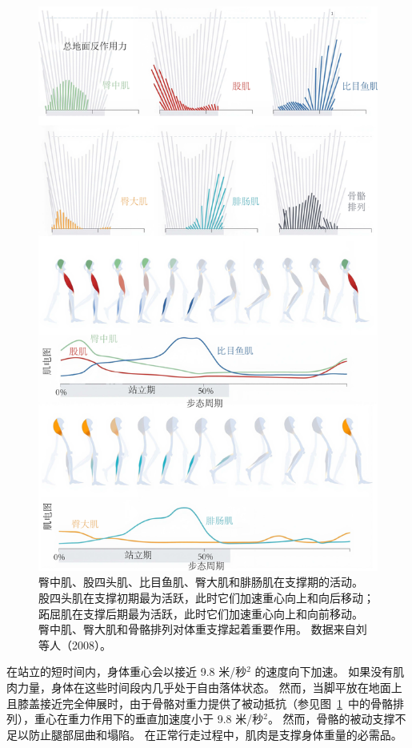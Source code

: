 \begin{figure}[!htb]
	\centering
	\includegraphics[width=1.0\linewidth]{chap11/11_2}
	\caption{臀中肌、股四头肌、比目鱼肌、臀大肌和腓肠肌在支撑期的活动。
		股四头肌在支撑初期最为活跃，此时它们加速重心向上和向后移动；
		跖屈肌在支撑后期最为活跃，此时它们加速重心向上和向前移动。
		臀中肌、臀大肌和骨骼排列对体重支撑起着重要作用。
		数据来自刘等人（2008）。 \label{fig:11_2}}
\end{figure}

在站立的短时间内，身体重心会以接近 9.8 米/秒$^2$ 的速度向下加速。
如果没有肌肉力量，身体在这些时间段内几乎处于自由落体状态。
然而，当脚平放在地面上且膝盖接近完全伸展时，由于骨骼对重力提供了被动抵抗（参见图~\ref{fig:11_2}~中的骨骼排列），重心在重力作用下的垂直加速度小于 9.8 米/秒$^2$。
然而，骨骼的被动支撑不足以防止腿部屈曲和塌陷。
在正常行走过程中，肌肉是支撑身体重量的必需品。


